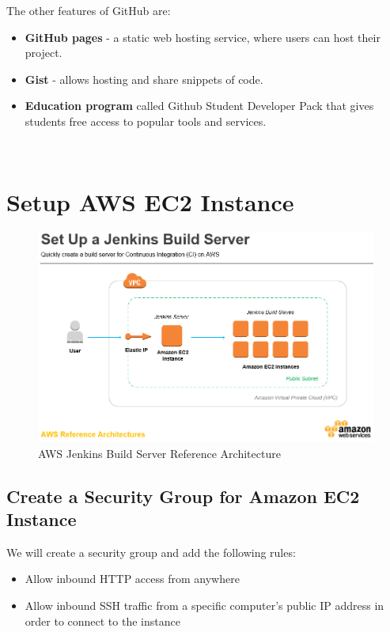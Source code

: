\documentclass[12pt,a4paper,twoside]{article}
\begin{document}
The other features of GitHub are:

\begin{itemize}
	\item \textbf{GitHub pages} - a static web hosting service, where users can host their project.
	\item \textbf{Gist} - allows hosting and share snippets of code.
	\item \textbf{Education program} called Github Student Developer Pack that gives students free access to popular tools and services. 
\end{itemize}








~\newpage


\section{Setup AWS EC2 Instance}




\begin{figure}[H]
    \centering
        \includegraphics[width=15cm]{images-aws/aws-jenkins.png}
        \caption{AWS Jenkins Build Server Reference Architecture \cite{JENKINS-BUILD-SERVER}}
\end{figure}



\subsection{Create a Security Group for Amazon EC2 Instance}


We will create a security group and add the following rules:
\begin{itemize}
	\item Allow inbound HTTP access from anywhere
	\item Allow inbound SSH traffic from a specific computer's public IP address in order to connect to the instance
\end{itemize}
\end{document}
